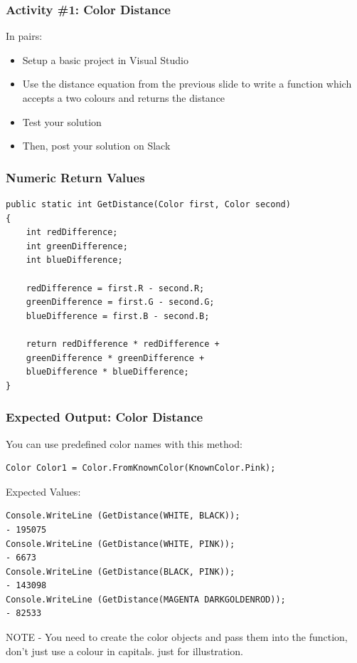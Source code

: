 
\begin{frame}
	\frametitle{Activity \#1: Color Distance}
	
	In pairs:
	
	\vspace{2em}
	
	\begin{itemize}		
		\item Setup a basic project in Visual Studio
		\item Use the distance equation from the previous slide to write a function which accepts a two colours and returns the distance
		\item Test your solution
		\item Then, post your solution on Slack
	\end{itemize}
\end{frame}

\begin{frame}[fragile]
	\frametitle{Numeric Return Values}
	
\begin{lstlisting}
public static int GetDistance(Color first, Color second)
{
	int redDifference;
	int greenDifference;
	int blueDifference;

	redDifference = first.R - second.R;
	greenDifference = first.G - second.G;
	blueDifference = first.B - second.B;

	return redDifference * redDifference + 
	greenDifference * greenDifference +
	blueDifference * blueDifference;
}
\end{lstlisting}


\end{frame}

\begin{frame}[fragile]
	\frametitle{Expected Output: Color Distance}
 You can use predefined color names with this method:
\begin{lstlisting}
Color Color1 = Color.FromKnownColor(KnownColor.Pink);	
\end{lstlisting}
Expected Values:	
\begin{lstlisting}
Console.WriteLine (GetDistance(WHITE, BLACK));
- 195075
Console.WriteLine (GetDistance(WHITE, PINK));
- 6673
Console.WriteLine (GetDistance(BLACK, PINK));
- 143098
Console.WriteLine (GetDistance(MAGENTA DARKGOLDENROD));
- 82533
\end{lstlisting}
NOTE - You need to create the color objects and pass them into the function, don't just use a colour in capitals. just for illustration.  
\end{frame}

